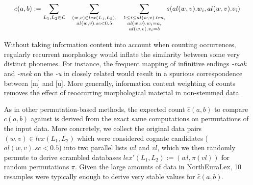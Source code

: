\begin{equation*}
c(a,b) := \sum_{L_1,L_2 \in \mathcal L} \hspace*{0.3cm} \sum_{\substack{(w,v) \in lex(L_1,L_2),\\ al(w,v).sc < 0.5}} \hspace*{0.3cm} \sum_{\substack{1 \leq i \leq al(w,v).len,\\ al(w,v).w_i = a,\\ al(w,v).v_i = b}} s(al(w,v).w_i,al(w,v).v_i)
\end{equation*}

Without taking information content into account when counting occurrences, regularly recurrent morphology would inflate the similarity between some very distinct phonemes. For instance, the frequent mapping of  infinitive endings \textit{-mak} and \textit{-mek} on the \textit{-u} in closely related  would result in a spurious correspondence between [m] and [u]. More generally, information content weighting of counts removes the effect of reoccurring morphological material in non-stemmed data.

As in other permutation-based methods, the expected count $\hat{c}(a,b)$ to compare $c(a,b)$ against is derived from the exact same computations on permutations of the input data. More concretely, we collect the original data pairs $(w,v) \in lex(L_1,L_2)$ which were considered cognate candidates ($al(w,v).sc < 0.5$) into two parallel lists $wl$ and $vl$, which we then randomly permute to derive scrambled databases $lex'(L_1,L_2) := (wl,\pi(vl))$ for random permutations $\pi$. Given the large amounts of data in NorthEuraLex, 10 resamples were typically enough to derive very stable values for $\hat{c}(a,b)$.

